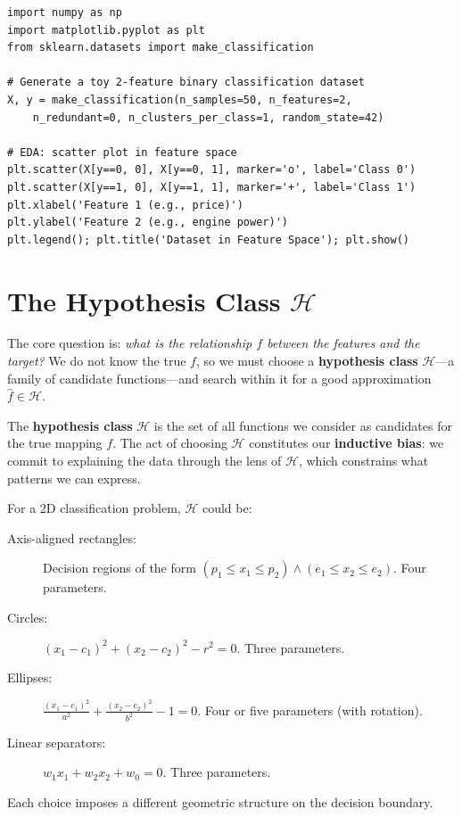 \begin{lstlisting}[style=pythonstyle]
import numpy as np
import matplotlib.pyplot as plt
from sklearn.datasets import make_classification

# Generate a toy 2-feature binary classification dataset
X, y = make_classification(n_samples=50, n_features=2,
    n_redundant=0, n_clusters_per_class=1, random_state=42)

# EDA: scatter plot in feature space
plt.scatter(X[y==0, 0], X[y==0, 1], marker='o', label='Class 0')
plt.scatter(X[y==1, 0], X[y==1, 1], marker='+', label='Class 1')
plt.xlabel('Feature 1 (e.g., price)')
plt.ylabel('Feature 2 (e.g., engine power)')
plt.legend(); plt.title('Dataset in Feature Space'); plt.show()
\end{lstlisting}

\section*{The Hypothesis Class $\mathcal{H}$}

The core question is: \emph{what is the relationship $f$ between the features and the target?} We do not know the true $f$, so we must choose a \textbf{hypothesis class} $\mathcal{H}$---a family of candidate functions---and search within it for a good approximation $\hat{f} \in \mathcal{H}$.

\begin{definition}
The \textbf{hypothesis class} $\mathcal{H}$ is the set of all functions we consider as candidates for the true mapping $f$. The act of choosing $\mathcal{H}$ constitutes our \textbf{inductive bias}: we commit to explaining the data through the lens of $\mathcal{H}$, which constrains what patterns we can express.
\end{definition}

\begin{remark}
For a 2D classification problem, $\mathcal{H}$ could be:
\begin{description}
    \item[Axis-aligned rectangles:] Decision regions of the form $(p_1 \leq x_1 \leq p_2) \wedge (e_1 \leq x_2 \leq e_2)$. Four parameters.
    \item[Circles:] $(x_1 - c_1)^2 + (x_2 - c_2)^2 - r^2 = 0$. Three parameters.
    \item[Ellipses:] $\frac{(x_1 - c_1)^2}{a^2} + \frac{(x_2 - c_2)^2}{b^2} - 1 = 0$. Four or five parameters (with rotation).
    \item[Linear separators:] $w_1 x_1 + w_2 x_2 + w_0 = 0$. Three parameters.
\end{description}
Each choice imposes a different geometric structure on the decision boundary.
\end{remark}

